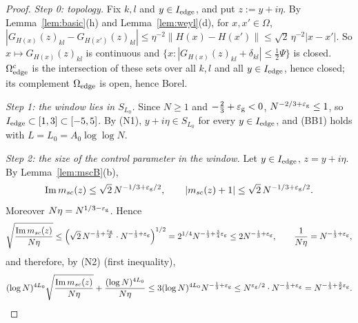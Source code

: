 \begin{proof}
\emph{Step 0: topology.} Fix $k,l$ and $y\in I_{\rm edge}$, and put $z:=y+i\eta$. By Lemma~\ref{lem:basic}(h) and Lemma~\ref{lem:weyl}(d), for $x,x'\in\Omega$,
$|G_{H(x)}(z)_{kl}-G_{H(x')}(z)_{kl}|\le\eta^{-2}\|H(x)-H(x')\|\le\sqrt2\,\eta^{-2}|x-x'|$. So $x\mapsto G_{H(x)}(z)_{kl}$ is continuous and
$\{x:|G_{H(x)}(z)_{kl}+\delta_{kl}|\le\frac12\Psi\}$ is closed. $\Omega^c_{\rm edge}$ is the intersection of these sets over all $k,l$ and all $y\in I_{\rm edge}$, hence
closed; its complement $\Omega_{\rm edge}$ is open, hence Borel.

\emph{Step 1: the window lies in $S_{L_0}$.} Since $N\ge1$ and $-\frac23+\varepsilon_{\mathrm g}<0$, $N^{-2/3+\varepsilon_{\mathrm g}}\le1$, so $I_{\rm edge}\subset[1,3]\subset[-5,5]$. By \textup{(N1)},
$y+i\eta\in S_{L_0}$ for every $y\in I_{\rm edge}$, and \textup{(BB1)} holds with $L=L_0=A_0\log\log N$.

\emph{Step 2: the size of the control parameter in the window.} Let $y\in I_{\rm edge}$, $z=y+i\eta$. By Lemma~\ref{lem:mscB}(b),
\begin{equation}\label{eq:B3msc}
\operatorname{Im}m_{sc}(z)\le\sqrt2\,N^{-1/3+\varepsilon_{\mathrm g}/2},\qquad|m_{sc}(z)+1|\le\sqrt2\,N^{-1/3+\varepsilon_{\mathrm g}/2}.
\end{equation}
Moreover $N\eta=N^{1/3-\varepsilon_{\mathrm g}}$. Hence
\[
\sqrt{\frac{\operatorname{Im}m_{sc}(z)}{N\eta}}\le\Big(\sqrt2\,N^{-\frac13+\frac{\varepsilon_{\mathrm g}}2}\cdot N^{-\frac13+\varepsilon_{\mathrm g}}\Big)^{1/2}=2^{1/4}N^{-\frac13+\frac34\varepsilon_{\mathrm g}}\le2N^{-\frac13+\varepsilon_{\mathrm g}},\qquad\frac1{N\eta}=N^{-\frac13+\varepsilon_{\mathrm g}},
\]
and therefore, by \textup{(N2)} (first inequality),
\begin{equation}\label{eq:B3ctrl}
(\log N)^{4L_0}\sqrt{\frac{\operatorname{Im}m_{sc}(z)}{N\eta}}+\frac{(\log N)^{4L_0}}{N\eta}\le3(\log N)^{4L_0}N^{-\frac13+\varepsilon_{\mathrm g}}\le N^{\varepsilon_{\mathrm g}/2}\cdot N^{-\frac13+\varepsilon_{\mathrm g}}=N^{-\frac13+\frac32\varepsilon_{\mathrm g}}.
\end{equation}


\end{proof}
